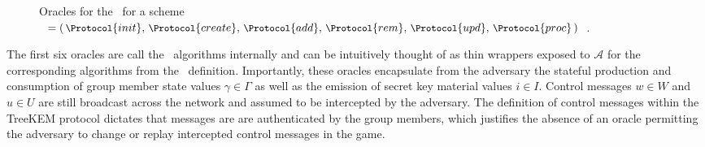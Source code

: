 \begin{figure}[ht!]
\centering
\caption[Oracles for the \CGKAsec]{%
\label{fig:CGKA-Oracles}%
Oracles for the \CGKAsec\ for a scheme \CGKAdef\ \(= \small\left(\,\Protocol{init},\, \Protocol{create},\, \Protocol{add},\, \Protocol{rem},\, \Protocol{upd},\, \Protocol{proc}\,\right)\).
}%
{}
\end{figure}

The first six oracles are call the \CGKAdef\ algorithms internally and can be intuitively thought of as thin wrappers exposed to \(\mathcal{A}\) for the corresponding algorithms from the \CGKAdef\ definition.
Importantly, these oracles encapsulate from the adversary the stateful production and consumption of group member state values \(\gamma \in \Gamma\) as well as the emission of secret key material values \(i \in I\).
Control messages \(w \in W\) and \(u \in U\) are still broadcast across the network and assumed to be intercepted by the adversary.
The definition of control messages within the TreeKEM protocol dictates that messages are are authenticated by the group members, which justifies the absence of an oracle permitting the adversary to change or replay intercepted control messages in the  game.

